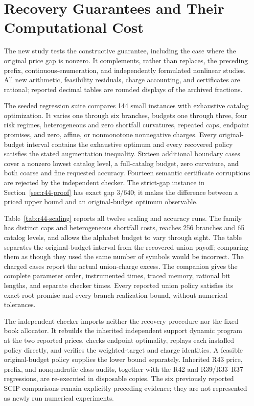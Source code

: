 \section{Recovery Guarantees and Their Computational Cost}\label{sec:r44-study}
The new study tests the constructive guarantee, including the case where the original price gap is nonzero. It complements, rather than replaces, the preceding prefix, continuous-enumeration, and independently formulated nonlinear studies. All new arithmetic, feasibility residuals, charge accounting, and certificates are rational; reported decimal tables are rounded displays of the archived fractions.

The seeded regression suite compares 144 small instances with exhaustive catalog optimization. It varies one through six branches, budgets one through three, four risk regimes, heterogeneous and zero shortfall curvatures, repeated caps, endpoint promises, and zero, affine, or nonmonotone nonnegative charges. Every original-budget interval contains the exhaustive optimum and every recovered policy satisfies the stated augmentation inequality. Sixteen additional boundary cases cover a nonzero lowest catalog level, a full-catalog budget, zero curvature, and both coarse and fine requested accuracy. Fourteen semantic certificate corruptions are rejected by the independent checker. The strict-gap instance in Section~\ref{sec:r44-proof} has exact gap $3/640$; it makes the difference between a priced upper bound and an original-budget optimum observable.

Table~\ref{tab:r44-scaling} reports all twelve scaling and accuracy runs. The family has distinct caps and heterogeneous shortfall costs, reaches 256 branches and 65 catalog levels, and allows the alphabet budget to vary through eight. The table separates the original-budget interval from the recovered union payoff; comparing them as though they used the same number of symbols would be incorrect. The charged cases report the actual union-charge excess. The companion gives the complete parameter order, instrumented times, traced memory, rational bit lengths, and separate checker times. Every reported union policy satisfies its exact root promise and every branch realization bound, without numerical tolerances.

The independent checker imports neither the recovery procedure nor the fixed-book allocator. It rebuilds the inherited independent support dynamic program at the two reported prices, checks endpoint optimality, replays each installed policy directly, and verifies the weighted-target and charge identities. A feasible original-budget policy supplies the lower bound separately. Inherited R43 price, prefix, and nonquadratic-class audits, together with the R42 and R39/R33--R37 regressions, are re-executed in disposable copies. The six previously reported SCIP comparisons remain explicitly preceding evidence; they are not represented as newly run numerical experiments.
